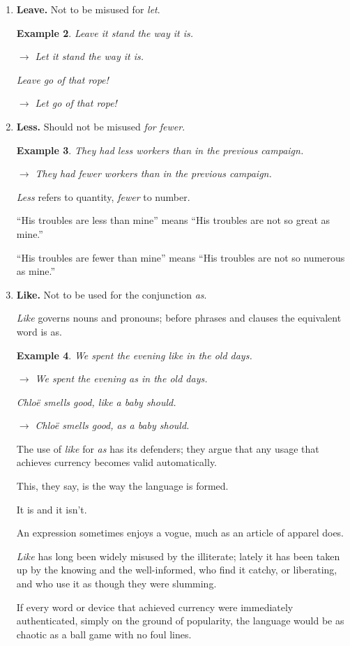 \documentclass{article}
\newtheorem{example}{Example}
\begin{document}
\begin{enumerate}
\begin{example}
		lay, laid, laid, laying
	\end{example}
	\item {\bf Leave.} Not to be misused for {\it let}.
	\begin{example}
		Leave it stand the way it is.
		
		$\to$ Let it stand the way it is.
		
		Leave go of that rope!
		
		$\to$ Let go of that rope!
	\end{example}
	\item {\bf Less.} Should not be misused {\it for fewer}.
	\begin{example}
		They had less workers than in the previous campaign.
		
		$\to$ They had fewer workers than in the previous campaign.
	\end{example}
	{\it Less} refers to quantity, {\it fewer} to number.
	
	``His troubles are less than mine'' means ``His troubles are not so great as mine.''
	
	``His troubles are fewer than mine'' means ``His troubles are not so numerous as mine.''
	\item {\bf Like.} Not to be used for the conjunction {\it as}.
	
	{\it Like} governs nouns and pronouns; before phrases and clauses the equivalent word is as.
	\begin{example}
		We spent the evening like in the old days.
		
		$\to$ We spent the evening as in the old days.
		
		Chlo\"e smells good, like a baby should.
		
		$\to$ Chlo\"e smells good, as a baby should.
	\end{example}
	The use of {\it like} for {\it as} has its defenders; they argue that any usage that achieves currency becomes valid automatically.
	
	This, they say, is the way the language is formed.
	
	It is and it isn't.
	
	An expression sometimes enjoys a vogue, much as an article of apparel does.
	
	{\it Like} has long been widely misused by the illiterate; lately it has been taken up by the knowing and the well-informed, who find it catchy, or liberating, and who use it as though they were slumming.
	
	If every word or device that achieved currency were immediately authenticated, simply on the ground of popularity, the language would be as chaotic as a ball game with no foul lines.
	

\end{enumerate}
\end{document}
